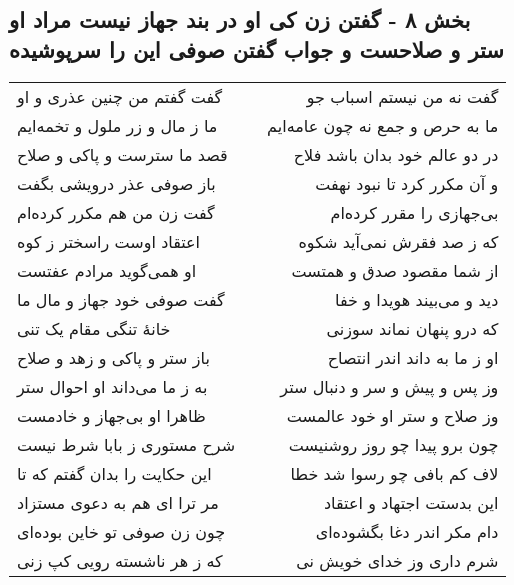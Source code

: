 \begin{center}
\section*{بخش ۸ - گفتن زن کی او در بند جهاز نیست مراد او ستر و صلاحست و جواب گفتن صوفی این را سرپوشیده}
\label{sec:sh008}
\begin{longtable}{l p{0.5cm} r}
گفت گفتم من چنین عذری و او
&&
گفت نه من نیستم اسباب جو
\\
ما ز مال و زر ملول و تخمه‌ایم
&&
ما به حرص و جمع نه چون عامه‌ایم
\\
قصد ما سترست و پاکی و صلاح
&&
در دو عالم خود بدان باشد فلاح
\\
باز صوفی عذر درویشی بگفت
&&
و آن مکرر کرد تا نبود نهفت
\\
گفت زن من هم مکرر کرده‌ام
&&
بی‌جهازی را مقرر کرده‌ام
\\
اعتقاد اوست راسختر ز کوه
&&
که ز صد فقرش نمی‌آید شکوه
\\
او همی‌گوید مرادم عفتست
&&
از شما مقصود صدق و همتست
\\
گفت صوفی خود جهاز و مال ما
&&
دید و می‌بیند هویدا و خفا
\\
خانهٔ تنگی مقام یک تنی
&&
که درو پنهان نماند سوزنی
\\
باز ستر و پاکی و زهد و صلاح
&&
او ز ما به داند اندر انتصاح
\\
به ز ما می‌داند او احوال ستر
&&
وز پس و پیش و سر و دنبال ستر
\\
ظاهرا او بی‌جهاز و خادمست
&&
وز صلاح و ستر او خود عالمست
\\
شرح مستوری ز بابا شرط نیست
&&
چون برو پیدا چو روز روشنیست
\\
این حکایت را بدان گفتم که تا
&&
لاف کم بافی چو رسوا شد خطا
\\
مر ترا ای هم به دعوی مستزاد
&&
این بدستت اجتهاد و اعتقاد
\\
چون زن صوفی تو خاین بوده‌ای
&&
دام مکر اندر دغا بگشوده‌ای
\\
که ز هر ناشسته رویی کپ زنی
&&
شرم داری وز خدای خویش نی
\\
\end{longtable}
\end{center}

